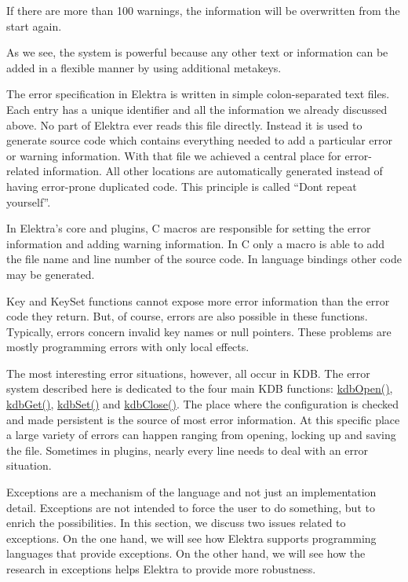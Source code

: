 If there are more than 100 warnings, the information will be overwritten from the start again.

As we see, the system is powerful because any other text or information can be added in a flexible manner by using additional metakeys.

The error specification in Elektra is written in simple colon-\/separated text files. Each entry has a unique identifier and all the information we already discussed above. No part of Elektra ever reads this file directly. Instead it is used to generate source code which contains everything needed to add a particular error or warning information. With that file we achieved a central place for error-\/related information. All other locations are automatically generated instead of having error-\/prone duplicated code. This principle is called “\+Don\textquotesingle{}t repeat yourself”.

In Elektra’s core and plugins, C macros are responsible for setting the error information and adding warning information. In C only a macro is able to add the file name and line number of the source code. In language bindings other code may be generated.

{\ttfamily Key} and {\ttfamily Key\+Set} functions cannot expose more error information than the error code they return. But, of course, errors are also possible in these functions. Typically, errors concern invalid key names or null pointers. These problems are mostly programming errors with only local effects.

The most interesting error situations, however, all occur in {\ttfamily K\+DB}. The error system described here is dedicated to the four main {\ttfamily K\+DB} functions\+: {\ttfamily \hyperlink{group__kdb_ga844e1299a84c3fbf1d3a905c5c893ba5}{kdb\+Open()}}, {\ttfamily \hyperlink{group__kdb_ga28e385fd9cb7ccfe0b2f1ed2f62453a1}{kdb\+Get()}}, {\ttfamily \hyperlink{group__kdb_ga11436b058408f83d303ca5e996832bcf}{kdb\+Set()}} and {\ttfamily \hyperlink{group__kdb_gadb54dc9fda17ee07deb9444df745c96f}{kdb\+Close()}}. The place where the configuration is checked and made persistent is the source of most error information. At this specific place a large variety of errors can happen ranging from opening, locking up and saving the file. Sometimes in plugins, nearly every line needs to deal with an error situation.

Exceptions are a mechanism of the language and not just an implementation detail. Exceptions are not intended to force the user to do something, but to enrich the possibilities. In this section, we discuss two issues related to exceptions. On the one hand, we will see how Elektra supports programming languages that provide exceptions. On the other hand, we will see how the research in exceptions helps Elektra to provide more robustness.

